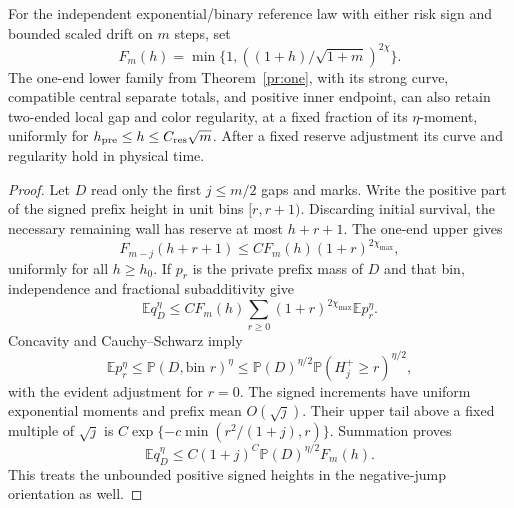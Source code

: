 \begin{lemma}\label{bridge:relative-REG}
For the independent exponential/binary reference law with either risk
sign and bounded scaled drift on $m$ steps, set
\[
 F_m(h)=\min\{1,((1+h)/\sqrt{1+m})^{2\chi}\}.
\]
The one-end lower family from Theorem~\ref{pr:one}, with its strong
curve, compatible central separate totals, and positive inner endpoint,
can also retain two-ended local gap and color regularity, at a fixed
fraction of its $\eta$-moment, uniformly for
$h_{\rm pre}\le h\le C_{\rm res}\sqrt m$. After a fixed reserve
adjustment its curve and regularity hold in physical time.
\end{lemma}
\begin{proof}
Let $D$ read only the first $j\le m/2$ gaps and marks. Write the
positive part of the signed prefix height in unit bins $[r,r+1)$.
Discarding initial survival, the necessary remaining wall has reserve
at most $h+r+1$. The one-end upper gives
\[
 F_{m-j}(h+r+1)\le C F_m(h)(1+r)^{2\chi_{\max}},
\]
uniformly for all $h\ge h_0$. If $p_r$ is the private prefix mass
of $D$ and that bin, independence and fractional subadditivity give
\[
 \mathbb E q_D^\eta
 \le C F_m(h)\sum_{r\ge0}(1+r)^{2\chi_{\max}}\mathbb E p_r^\eta.
\]
Concavity and Cauchy--Schwarz imply
\[
 \mathbb E p_r^\eta
 \le\mathbb P(D,\text{bin }r)^\eta
 \le\mathbb P(D)^{\eta/2}
       \mathbb P(H_j^+\ge r)^{\eta/2},
\]
with the evident adjustment for $r=0$. The signed increments have
uniform exponential moments and prefix mean $O(\sqrt j)$. Their
upper tail above a fixed multiple of $\sqrt j$ is
$C\exp\{-c\min(r^2/(1+j),r)\}$. Summation proves
\begin{equation}
 \mathbb E q_D^\eta
 \le C(1+j)^C\mathbb P(D)^{\eta/2}F_m(h).
 \label{bridge:bad-prefix}
\end{equation}
This treats the unbounded positive signed heights in the negative-jump
orientation as well.


\end{proof}
